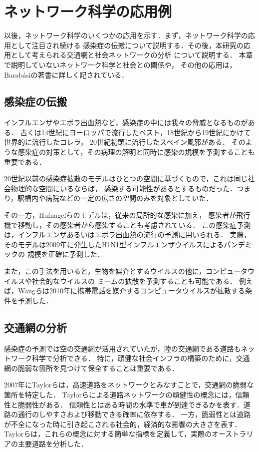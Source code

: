 \section{ネットワーク科学の応用例}

以後，ネットワーク科学のいくつかの応用を示す．まず，ネットワーク科学の応用として注目され続ける
感染症の伝搬について説明する．その後，本研究の応用として考えられる交通網と社会ネットワークの分析
について説明する．
本章で説明していないネットワーク科学と社会との関係や，
その他の応用は，Barab{\'{a}}siの著書\cite{Barabasi2016}に詳しく記されている．

\subsection{感染症の伝搬}

インフルエンザやエボラ出血熱など，感染症の中には我々の脅威となるものがある．
古くは14世紀にヨーロッパで流行したペスト，18世紀から19世紀にかけて世界的に流行したコレラ，
20世紀初頭に流行したスペイン風邪がある．
そのような感染症の対策として，その病理の解明と同時に感染の規模を予測することも重要である．

20世紀以前の感染症拡散のモデルはひとつの空間に基づくもので，これは同じ社会物理的な空間にいるならば，
感染する可能性があるとするものだった．つまり，駅構内や病院などの一定の広さの空間のみを対象としていた．

その一方，Hufnagelらのモデル\cite{Hufnagel2004}は，従来の局所的な感染に加え，
感染者が飛行機で移動し，その感染者から感染することも考慮されている．
この感染症予測は，インフルエンザあるいはエボラ出血熱の流行の予測に用いられる．
実際，そのモデルは2009年に発生したH1N1型インフルエンザウイルスによるパンデミックの
規模を正確に予測した\cite{Balcan2009}．

また，この手法を用いると，生物を媒介とするウイルスの他に，コンピュータウイルスや社会的なウイルスの
ミームの拡散を予測することも可能である．
例えば，Wangらは2010年に携帯電話を媒介するコンピュータウイルスが拡散する条件を予測した\cite{Wang2009}．

\subsection{交通網の分析}

感染症の予測では空の交通網が活用されていたが，陸の交通網である道路もネットワーク科学で分析できる．
特に，頑健な社会インフラの構築のために，交通網の脆弱な箇所を見つけて保全することは重要である．

2007年にTaylorらは，高速道路をネットワークとみなすことで，交通網の脆弱な箇所を特定した\cite{Taylor2007}．
Taylorらによる道路ネットワークの頑健性の概念には，信頼性と脆弱性がある．
信頼性とはある時間の水準で車が到達できるかを表す．道路の通行のしやすさおよび移動できる確率に依存する．
一方，脆弱性とは道路が不全になった時に引き起こされる社会的，経済的な影響の大きさを表す．
Taylorらは，これらの概念に対する簡単な指標を定義して，実際のオーストラリアの主要道路を分析した．

